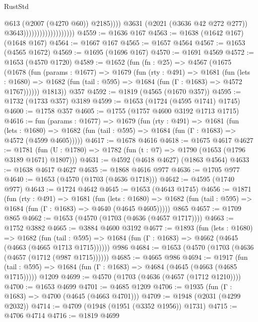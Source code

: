 \begin{lexlean}{RustStd}
\begin{coremodule}
{\begin{coremodule}
{{{{{{{{{{{{{{{{                                                  @613
                                                  (@2007 (@4270 @60))
                                                  @2185))))
                                          @3631
                                          (@2021 (@3636 @42 @272 @277))
                                          @3643)))))))))))))))))))
@4559 := @1636 @167
@4563 := @1638 (@1642 @167) (@1648 @167)
@4564 := @1667 @167
@4565 := @1657 @4564
@4567 := @1653 (@4565 @1672)
@4569 := @1695 (@1696 @167)
@4570 := @1691 @4569
@4572 := @1653 (@4570 @1720)
@4589 := @1652
    (fun (fn : @25) =>
    @4567
      (@1675
        (@1678
          (fun (params : @1677) =>
          @1679
            (fun (rty : @491) =>
            @1681
              (fun (lets : @1680) =>
              @1682 (fun (tail : @595) => @1684 (fun (Γ : @1683) => @4572 @1767))))))
        @1813))
    @357
@4592 := @1819 (@4565 (@1670 @357))
@4595 := @1732 (@1733 @357) @3189
@4599 := @1653 (@1724 (@4595 @1741) @1745)
@4600 := @1758 @357
@4605 := @1755 (@1757 @4600 @3192 @1713 @1715)
@4616 := fun (params : @1677) =>
  @1679
    (fun (rty : @491) =>
    @1681
      (fun (lets : @1680) =>
      @1682 (fun (tail : @595) => @1684 (fun (Γ : @1683) => @4572 (@4599 @4605)))))
@4617 := @1678 @4616
@4618 := @1675 @4617
@4627 := @1781 (fun (U : @1780) => @1782 (fun (t : @7) => @1790 (@1653 (@1796 @3189 @1671) @1807)))
@4631 := @4592 (@4618 @4627) (@1863 @4564)
@4633 := @1638 @4617 @4627
@4635 := @1868 @4616 @977
@4636 := @1705 @977
@4640 := @1653 (@4570 (@1703 (@4636 @1718)))
@4642 := @4595 (@1740 @977)
@4643 := @1724 @4642
@4645 := @1653 (@4643 @1745)
@4656 := @1871
    (fun (rty : @491) =>
    @1681
      (fun (lets : @1680) =>
      @1682 (fun (tail : @595) => @1684 (fun (Γ : @1683) => @4640 (@4645 @4605)))))
    @865
@4657 := @1709 @865
@4662 := @1653 (@4570 (@1703 (@4636 (@4657 @1717))))
@4663 := @1752 @3882
@4665 := @3884 @4600 @3192
@4677 := @1893
    (fun (lets : @1680) =>
    @1682
      (fun (tail : @595) => @1684 (fun (Γ : @1683) => @4662 (@4645 (@4663 (@4665 @1713 @1715))))))
    @986
@4684 := @1653 (@4570 (@1703 (@4636 (@4657 (@1712 (@987 @1715))))))
@4685 := @4665 @986
@4694 := @1917
    (fun (tail : @595) => @1684 (fun (Γ : @1683) => @4684 (@4645 (@4663 (@4685 @1715)))))
    @1209
@4699 := @4570 (@1703 (@4636 (@4657 (@1712 @1210))))
@4700 := @1653 @4699
@4701 := @4685 @1209
@4706 := @1935 (fun (Γ : @1683) => @4700 (@4645 (@4663 @4701)))
@4709 := @1948 (@2031 (@4299 @2032))
@4714 := @4709 (@1948 (@1951 (@3352 @1956)) @1731)
@4715 := @4706 @4714
@4716 := @1819 @4699
}}}}}}}}}}}}}}}}
\end{coremodule}}
\end{coremodule}
\end{lexlean}
